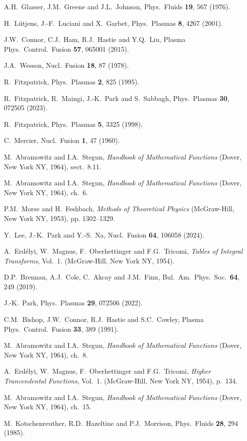 \documentclass[12pt,prb,aps]{revtex4-1}
\begin{document}
\begin{thebibliography}{99}
 A.H.~Glasser, J.M.~Greene  and J.L.~Johnson, Phys.\ Fluids {\bf 19}, 567 (1976).

 H.~L\"{u}tjens, J.-F.~Luciani and X.~Garbet, Phys.\ Plasmas {\bf 8}, 4267 (2001).

 J.W.~Connor, C.J.~Ham, R.J.~Hastie and Y.Q.~Liu, Plasma Phys.\ Control.\ Fusion {\bf 57}, 065001 (2015). 

 J.A.~Wesson, Nucl.\ Fusion {\bf 18},  87 (1978).

 R.~Fitzpatrick, Phys.\ Plasmas {\bf 2}, 825 (1995).

 R.~Fitzpatrick, R.~Maingi, J.-K.~Park and S.~Sabbagh, Phys.\ Plasmas {\bf 30}, 072505 (2023).

 R.~Fitzpatrick, Phys.\ Plasmas {\bf 5}, 3325 (1998).

 C.~Mercier, Nucl.\ Fusion {\bf 1}, 47 (1960).

 M.~Abramowitz and I.A.~Stegun, {\em Handbook of Mathematical Functions}\/ (Dover, New York NY, 1964), sect.~8.11.

 M.~Abramowitz and I.A.~Stegun, {\em Handbook of Mathematical Functions}\/ (Dover, New York NY, 1964), ch.~6.

 P.M.~Morse and H.~Feshbach, {\em Methods of Theoretical Physics}\/ (McGraw-Hill, New York NY, 1953), pp. 1302–1329.

 Y.~Lee, J.-K.~Park and Y.-S.~Na, Nucl.\ Fusion {\bf 64}, 106058 (2024). 

 A.~Erd\'{e}lyi, W.~Magnus, F.~Oberhettinger and F.G.~Tricomi, {\em Tables of Integral Transforms}, Vol.~1. (McGraw-Hill, New York NY, 1954).

 D.P.~Brennan, A.J.~Cole, C.~Akcay and J.M.~Finn, Bul.\ Am.\ Phys.\ Soc.\ {\bf 64}, 249 (2019).

 J.-K.~Park, Phys.\ Plasmas {\bf 29}, 072506 (2022).

 C.M.~Bishop, J.W.~Connor, R.J.~Hastie and S.C.~Cowley, Plasma Phys.\ Control.\ Fusion {\bf 33}, 389 (1991). 

 M.~Abramowitz and I.A.~Stegun, {\em Handbook of Mathematical Functions}\/ (Dover, New York NY, 1964), ch.~8.

 A.~Erd\'{e}lyi, W.~Magnus, F.~Oberhettinger and F.G.~Tricomi, {\em Higher Trancendental Functions}, Vol.~1. (McGraw-Hill, New York NY, 1954), p.~134.

 M.~Abramowitz and I.A.~Stegun, {\em Handbook of Mathematical Functions}\/ (Dover, New York NY, 1964), ch.~15.

 M.~Kotschenreuther, R.D.~Hazeltine and P.J.~Morrison, Phys.\ Fluids {\bf 28}, 294 (1985). 

\end{thebibliography}
\end{document}
